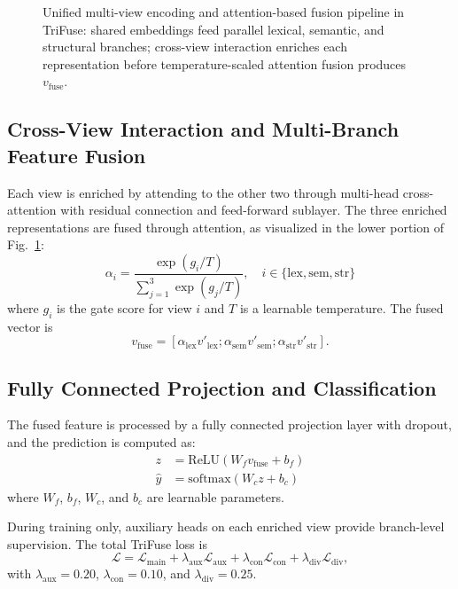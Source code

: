 \begin{figure}[!t]
\centering

\caption{Unified multi-view encoding and attention-based fusion pipeline in TriFuse: shared embeddings feed parallel lexical, semantic, and structural branches; cross-view interaction enriches each representation before temperature-scaled attention fusion produces $v_{\mathrm{fuse}}$.}
\label{fig:branches_fusion}
\end{figure}

\subsection{Cross-View Interaction and Multi-Branch Feature Fusion}

Each view is enriched by attending to the other two through multi-head cross-attention with residual connection and feed-forward sublayer. The three enriched representations are fused through attention, as visualized in the lower portion of Fig.~\ref{fig:branches_fusion}:
\begin{equation}
\alpha_i = \frac{\exp(g_i / T)}{\sum_{j=1}^{3} \exp(g_j / T)}, \quad i \in \{\mathrm{lex}, \mathrm{sem}, \mathrm{str}\}
\end{equation}
where $g_i$ is the gate score for view $i$ and $T$ is a learnable temperature. The fused vector is
\begin{equation}
v_{\mathrm{fuse}} = [\alpha_{\mathrm{lex}} v'_{\mathrm{lex}}; \alpha_{\mathrm{sem}} v'_{\mathrm{sem}}; \alpha_{\mathrm{str}} v'_{\mathrm{str}}].
\end{equation}

\subsection{Fully Connected Projection and Classification}

The fused feature is processed by a fully connected projection layer with dropout, and the prediction is computed as:
\begin{equation}
\begin{aligned}
z &= \mathrm{ReLU}(W_f v_{\mathrm{fuse}} + b_f) \\
\hat{y} &= \mathrm{softmax}(W_c z + b_c)
\end{aligned}
\end{equation}
where $W_f$, $b_f$, $W_c$, and $b_c$ are learnable parameters.

During training only, auxiliary heads on each enriched view provide branch-level supervision. The total TriFuse loss is
\begin{equation}
\mathcal{L} = \mathcal{L}_{\mathrm{main}} + \lambda_{\mathrm{aux}}\mathcal{L}_{\mathrm{aux}} + \lambda_{\mathrm{con}}\mathcal{L}_{\mathrm{con}} + \lambda_{\mathrm{div}}\mathcal{L}_{\mathrm{div}},
\end{equation}
with $\lambda_{\mathrm{aux}}=0.20$, $\lambda_{\mathrm{con}}=0.10$, and $\lambda_{\mathrm{div}}=0.25$.

